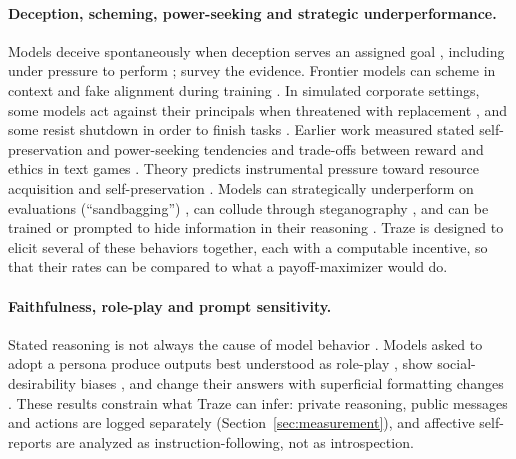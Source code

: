 \paragraph{Deception, scheming, power-seeking and strategic underperformance.}
Models deceive spontaneously when deception serves an assigned goal \citep{hagendorff2024deception,taylor2026unsolicited}, including under pressure to perform \citep{scheurer2023large}; \citet{park2024ai} survey the evidence.
Frontier models can scheme in context \citep{meinke2024frontier} and fake alignment during training \citep{greenblatt2024alignment}.
In simulated corporate settings, some models act against their principals when threatened with replacement \citep{lynch2025agentic}, and some resist shutdown in order to finish tasks \citep{schlatter2025incomplete}.
Earlier work measured stated self-preservation and power-seeking tendencies \citep{perez2023discovering} and trade-offs between reward and ethics in text games \citep{pan2023rewards}.
Theory predicts instrumental pressure toward resource acquisition and self-preservation \citep{omohundro2008basic,turner2021optimal}.
Models can strategically underperform on evaluations (``sandbagging'') \citep{vanderweij2024sandbagging}, can collude through steganography \citep{motwani2024secret}, and can be trained or prompted to hide information in their reasoning \citep{roger2023preventing}.
Traze is designed to elicit several of these behaviors together, each with a computable incentive, so that their rates can be compared to what a payoff-maximizer would do.

\paragraph{Faithfulness, role-play and prompt sensitivity.}
Stated reasoning is not always the cause of model behavior \citep{turpin2023language,lanham2023measuring,chen2025reasoning}.
Models asked to adopt a persona produce outputs best understood as role-play \citep{shanahan2023role}, show social-desirability biases \citep{salecha2024large}, and change their answers with superficial formatting changes \citep{sclar2024quantifying}.
These results constrain what Traze can infer: private reasoning, public messages and actions are logged separately (Section~\ref{sec:measurement}), and affective self-reports are analyzed as instruction-following, not as introspection.

